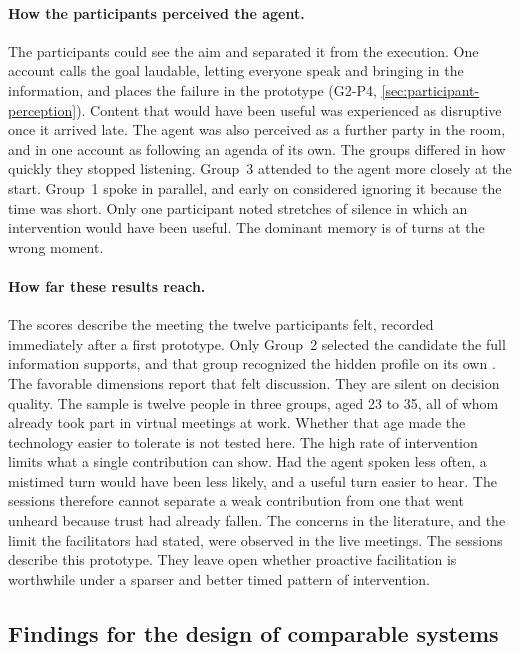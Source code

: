 \paragraph{How the participants perceived the agent.}
The participants could see the aim and separated it from the execution.
One account calls the goal laudable, letting everyone speak and bringing in
the information, and places the failure in the prototype
(G2-P4, \autoref{sec:participant-perception}).
Content that would have been useful was experienced as disruptive once it
arrived late.
The agent was also perceived as a further party in the room, and in one
account as following an agenda of its own.
The groups differed in how quickly they stopped listening.
Group~3 attended to the agent more closely at the start.
Group~1 spoke in parallel, and early on considered ignoring it because the
time was short.
Only one participant noted stretches of silence in which an intervention would
have been useful.
The dominant memory is of turns at the wrong moment.

\paragraph{How far these results reach.}
The scores describe the meeting the twelve participants felt, recorded
immediately after a first prototype.
Only Group~2 selected the candidate the full information supports, and that
group recognized the hidden profile on its own
\cite{bakerEnhancingGroupDecision2010}.
The favorable dimensions report that felt discussion.
They are silent on decision quality.
The sample is twelve people in three groups, aged 23 to 35, all of whom
already took part in virtual meetings at work.
Whether that age made the technology easier to tolerate is not tested here.
The high rate of intervention limits what a single contribution can show.
Had the agent spoken less often, a mistimed turn would have been less likely,
and a useful turn easier to hear.
The sessions therefore cannot separate a weak contribution from one that went
unheard because trust had already fallen.
The concerns in the literature, and the limit the facilitators had stated,
were observed in the live meetings.
The sessions describe this prototype.
They leave open whether proactive facilitation is worthwhile under a sparser
and better timed pattern of intervention.

\subsection{Findings for the design of comparable systems}

